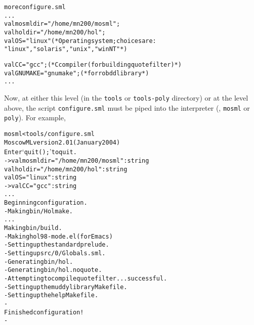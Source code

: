 \begin{session}
\begin{alltt}
\dol more configure.sml
  ...
val mosmldir = "/home/mn200/mosml";
val holdir   = "/home/mn200/hol";
val OS       = "linux"       (* Operating system; choices are:
                                "linux", "solaris", "unix", "winNT" *)

val CC       = "gcc";     (* C compiler (for building quote filter)        *)
val GNUMAKE  = "gnumake"; (* for robdd library                             *)
  ...
\dol
\end{alltt}
\end{session}

\noindent Now, at either this level (in the \texttt{tools} or
\texttt{tools-poly} directory) or at the level above, the script
\texttt{configure.sml} must be piped into the \ML{} interpreter (\ie,
\texttt{mosml} or \texttt{poly}).  For example,

\begin{session}
\begin{alltt}
\dol mosml < tools/configure.sml
Moscow ML version 2.01 (January 2004)
Enter `quit();' to quit.
- > val mosmldir = "/home/mn200/mosml" : string
  val holdir = "/home/mn200/hol" : string
  val OS = "linux" : string
- > val CC = "gcc" : string
  ...
Beginning configuration.
- Making bin/Holmake.
  ...
Making bin/build.
- Making hol98-mode.el (for Emacs)
- Setting up the standard prelude.
- Setting up src/0/Globals.sml.
- Generating bin/hol.
- Generating bin/hol.noquote.
- Attempting to compile quote filter ... successful.
- Setting up the muddy library Makefile.
- Setting up the help Makefile.
-
Finished configuration!
-
\dol
\end{alltt}
\end{session}



